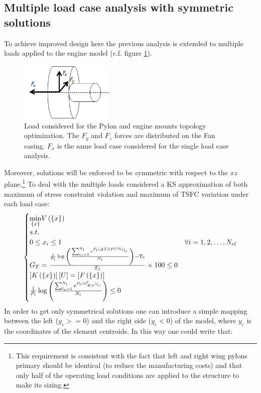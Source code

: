  \subsection{Multiple load case analysis with symmetric solutions}
 To achieve improved design here the previous analysis is extended to multiple loads applied to the engine model (c.f. figure \ref{fig.2.23}).
  \begin{figure}[ht]
  \centering
  \includegraphics[width=0.4\textwidth]{images/Ch2/Design_problem_multi_load}
  \caption{Load considered for the Pylon and engine mounts topology optimization. The $F_y$ and $F_z$ forces are distributed on the Fan casing. $F_x$ is the same load case considered for the single load case analysis.}
  \label{fig.2.23}
  \end{figure}
  Moreover, solutions will be enforced to be symmetric with respect to the $xz$ plane.\footnote{This requirement is consistent with the fact that left and right wing pylons primary should be identical (to reduce the manufacturing costs) and that only half of the operating load conditions are applied to the structure to make its sizing.}  To deal with the multiple loads considered a KS approximation of both maximum of stress constraint violation and maximum of TSFC variation under each load case:
 \begin{equation}
 \label{topoeq3}
 \begin{cases}
 \underset{\lbrace x\rbrace}{\min} V\left(\lbrace x\rbrace\right)& \\
 s.t. & \\ 0\leq x_i \leq 1  & \forall i=1,2,\dots,N_{el}\\
 G_T=\frac{\frac{1}{P_l}\log{\left(\frac{\sum_{l_c=1}^{N_l}e^{P_l(\Delta TSFC \% )_{l_c}}}{N_l}\right)}-T_0}{T_0}\times 100 \leq 0 & \\
 \left[K\left(\lbrace x\rbrace\right)\right]\left[{U}\right] = \left[{ F \left(\lbrace x\rbrace\right)}\right]& \\
 \frac{1}{P_l}\log{\left(\frac{\sum_{l_c=1}^{N_l}e^{P_l(G^{l}_{KS})_{l_c}}}{N_l}\right)}\leq 0
 \end{cases}
 \end{equation}
 In order to get only symmetrical solutions one can introduce a simple mapping between the left ($y_c>= 0$) and the right side ($y_c< 0$) of the model, where $y_c$ is the coordinates of the element centroids. In this way one could write that:
